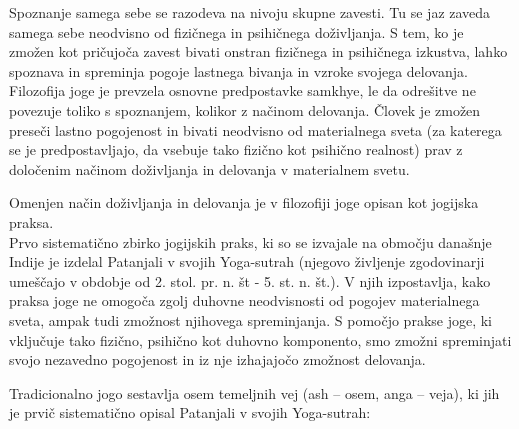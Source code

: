 \documentclass[a4paper, 12pt]{book}
\begin{document}
Spoznanje samega sebe se razodeva na nivoju skupne zavesti. Tu se jaz zaveda samega sebe neodvisno od fizičnega in psihičnega doživljanja. S tem, ko je zmožen kot pričujoča zavest bivati onstran fizičnega in psihičnega izkustva, lahko spoznava in spreminja pogoje lastnega bivanja in vzroke svojega delovanja. \\

Filozofija joge je prevzela osnovne predpostavke samkhye, le da odrešitve ne povezuje toliko s spoznanjem, kolikor z načinom delovanja. Človek je zmožen preseči lastno pogojenost in bivati neodvisno od materialnega sveta (za katerega se je predpostavljajo, da vsebuje tako fizično kot psihično realnost) prav z določenim načinom doživljanja in delovanja v materialnem svetu.

Omenjen način doživljanja in delovanja je v filozofiji joge opisan kot jogijska praksa. \\ 
Prvo sistematično zbirko jogijskih praks, ki so se izvajale na območju današnje Indije je izdelal Patanjali v svojih Yoga-sutrah (njegovo življenje zgodovinarji umeščajo v obdobje od 2. stol. pr. n. št - 5. st. n. št.). V njih izpostavlja, kako praksa joge ne omogoča zgolj duhovne neodvisnosti od pogojev materialnega sveta, ampak tudi zmožnost njihovega spreminjanja. S pomočjo prakse joge, ki vključuje tako fizično, psihično kot duhovno komponento, smo zmožni spreminjati svojo nezavedno pogojenost in iz nje izhajajočo zmožnost delovanja.~\cite{ZgodovinaJoge}

Tradicionalno jogo sestavlja osem temeljnih vej (ash – osem, anga – veja), ki jih je prvič sistematično opisal Patanjali v svojih Yoga-sutrah:
\end{document}
